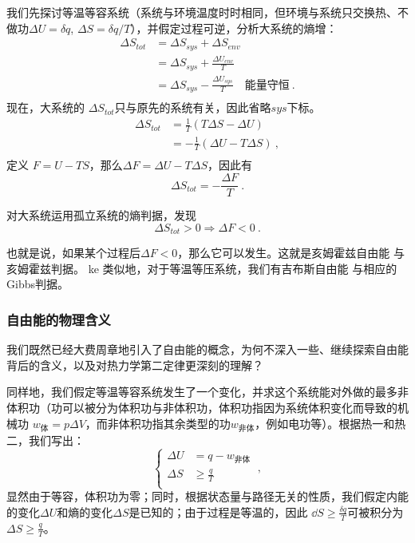 我们先探讨等温等容系统（系统与环境温度时时相同，但环境与系统只交换热、不做功$\Delta U = \delta q$, $\Delta S = \delta q / T$），并假定过程可逆，分析大系统的熵增：
\begin{equation}
\begin{aligned}
\Delta {S_{tot}}
 &=\Delta {S_{sys}}+\Delta {S_{env}}\\
 & =\Delta {S_{sys}}+ \frac{\Delta U_{{env}}}{T}\\
 & = \Delta {S_{sys}} - \frac{\Delta U_{{sys}}}{T} \quad \text{能量守恒}~.\\
 \end{aligned}
\end{equation}
现在，大系统的 $\Delta {S_{tot}}$只与原先的系统有关，因此省略$sys$下标。
\begin{equation}
\begin{aligned}
\Delta {S_{tot}}
 & = \frac{1}{T}(T \Delta {S} -\Delta U )\\
 & = - \frac{1}{T}(\Delta U - T \Delta {S} )~,\\
\end{aligned}
\end{equation}
定义 $F = U-TS$，那么$\Delta F = \Delta U - T \Delta S$，因此有
\begin{equation}
\Delta S_{tot} = -\frac{\Delta F}{T}~.
\end{equation}

对大系统运用孤立系统的熵判据，发现
\begin{equation}
\Delta S_{tot} > 0\Rightarrow \Delta F < 0~.
\end{equation}

也就是说，如果某个过程后$\Delta F < 0$，那么它可以发生。这就是亥姆霍兹自由能 与 亥姆霍兹判据。
ke
类似地，对于等温等压系统，我们有吉布斯自由能 与相应的Gibbs判据。

\subsubsection{自由能的物理含义}
我们既然已经大费周章地引入了自由能的概念，为何不深入一些、继续探索自由能背后的含义，以及对热力学第二定律更深刻的理解？

同样地，我们假定等温等容系统发生了一个变化，并求这个系统能对外做的最多非体积功（功可以被分为体积功与非体积功，体积功指因为系统体积变化而导致的机械功  $w_\text{体}=p\Delta V$，而非体积功指其余类型的功$w_\text{非体}$，例如电功等）。根据热一和热二，我们写出：
\begin{equation}
\left \{
    \begin{aligned}
    \Delta U &= q-w_\text{非体}\\
    \Delta S &\ge \frac{q}{T}\\
    \end{aligned}
\right.~,
\end{equation}
显然由于等容，体积功为零；同时，根据状态量与路径无关的性质，我们假定内能的变化$\Delta U$和熵的变化$\Delta S$是已知的；由于过程是等温的，因此 $\dd S \ge \frac{\delta q}{T}$可被积分为 $\Delta S \ge \frac{q}{T}$。

